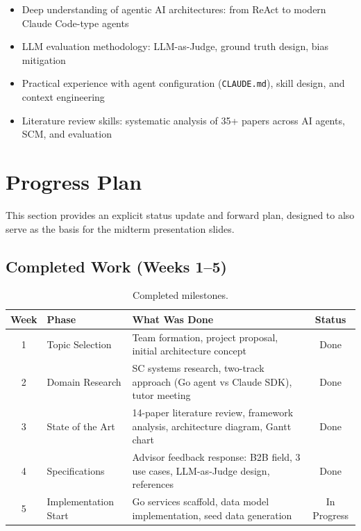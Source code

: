 \documentclass[12pt,a4paper]{report}
\begin{document}
\begin{itemize}[itemsep=0.3em]
    \item Deep understanding of agentic AI architectures: from ReAct to modern Claude Code-type agents
    \item LLM evaluation methodology: LLM-as-Judge, ground truth design, bias mitigation
    \item Practical experience with agent configuration (\texttt{CLAUDE.md}), skill design, and context engineering
    \item Literature review skills: systematic analysis of 35+ papers across AI agents, SCM, and evaluation
\end{itemize}

\chapter{Progress Plan}

This section provides an explicit status update and forward plan, designed to also serve as the basis for the midterm presentation slides.

\section{Completed Work (Weeks 1--5)}

\begin{table}[H]
\centering\small
\caption{Completed milestones.}
\begin{tabularx}{\textwidth}{@{} c l X c @{}}
\toprule
\textbf{Week} & \textbf{Phase} & \textbf{What Was Done} & \textbf{Status} \\
\midrule
1 & Topic Selection       & Team formation, project proposal, initial architecture concept & Done \\
2 & Domain Research       & SC systems research, two-track approach (Go agent vs Claude SDK), tutor meeting & Done \\
3 & State of the Art      & 14-paper literature review, framework analysis, architecture diagram, Gantt chart & Done \\
4 & Specifications        & Advisor feedback response: B2B field, 3 use cases, LLM-as-Judge design, references & Done \\
5 & Implementation Start  & Go services scaffold, data model implementation, seed data generation & In Progress \\
\bottomrule
\end{tabularx}
\end{table}
\end{document}
